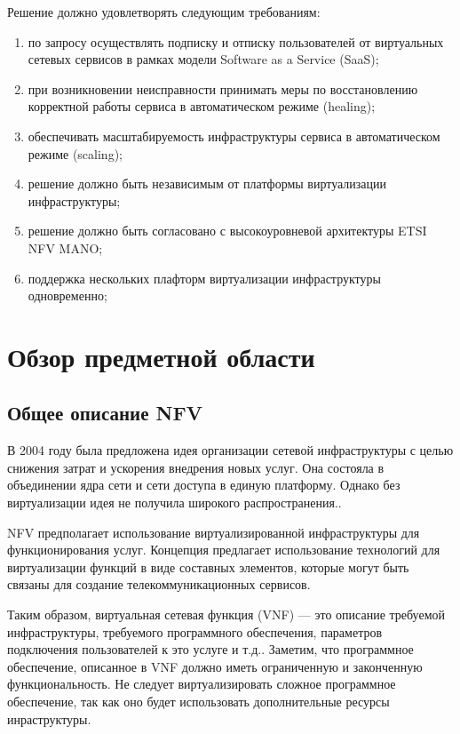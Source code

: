 \documentclass[oneside,final,14pt,a4paper]{extreport}
\begin{document}
Решение должно удовлетворять следующим требованиям:
\begin{enumerate}
	\item по запросу осуществлять подписку и отписку пользователей от виртуальных сетевых сервисов в рамках модели Software as a Service (SaaS);
	\item при возникновении неисправности принимать меры по восстановлению корректной работы сервиса в автоматическом режиме (healing);
	\item обеспечивать масштабируемость инфраструктуры сервиса в автоматическом режиме (scaling);
	\item решение должно быть независимым от платформы виртуализации инфраструктуры;
	\item решение должно быть согласовано с высокоуровневой архитектуры ETSI NFV MANO;
	\item поддержка нескольких плафторм виртуализации инфраструктуры одновременно;
\end{enumerate}





\chapter{Обзор предметной области}
\section{Общее описание NFV}
В 2004 году была предложена идея организации сетевой инфраструктуры с целью снижения затрат и ускорения внедрения новых услуг. Она состояла в объединении ядра сети и сети доступа в единую платформу. Однако без виртуализации идея не получила широкого распространения.\cite{nfv-state2}.

NFV предполагает использование виртуализированной инфраструктуры для функционирования услуг. Концепция предлагает использование технологий для виртуализации функций в виде составных элементов, которые могут быть связаны для создание телекоммуникационных сервисов. 

Таким образом, виртуальная сетевая функция (VNF) --- это описание требуемой инфраструктуры, требуемого программного обеспечения, параметров подключения пользователей к это услуге и т.д.. Заметим, что программное обеспечение, описанное в VNF должно иметь ограниченную и законченную функциональность. Не следует виртуализировать сложное программное обеспечение, так как оно будет использовать дополнительные ресурсы инраструктуры.
\end{document}
